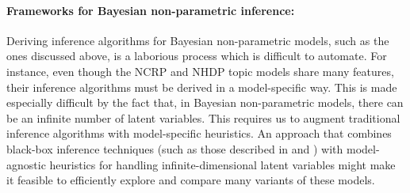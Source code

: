 \documentclass{article}
\begin{document}
\paragraph{Frameworks for Bayesian non-parametric inference:}
Deriving inference algorithms for Bayesian non-parametric models, such as the ones discussed above, is a laborious process which is difficult to automate.
For instance, even though the NCRP and NHDP topic models share many features, their inference algorithms must be derived in a model-specific way.
This is made especially difficult by the fact that, in Bayesian non-parametric models, there can be an infinite number of latent variables.
This requires us to augment traditional inference algorithms with model-specific heuristics.
An approach that combines black-box inference techniques (such as those described in \cite{ranganath2014blackbox} and \cite{ranganath2016operator}) with model-agnostic heuristics for handling infinite-dimensional latent variables might make it feasible to efficiently explore and compare many variants of these models.

\clearpage
\nocite{*}
%


\end{document}
